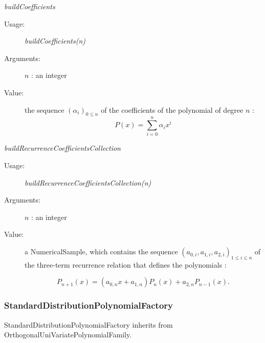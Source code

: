 \begin{description}
\begin{description}
\item \textit{buildCoefficients}
\begin{description}
\item[Usage:]  \textit{buildCoefficients(n)}
\item[Arguments:] $n$ : an integer
\item[Value:]  the sequence $(\alpha_i)_{0 \leq n}$ of the coefficients of the polynomial of degree $n$ :
\begin{equation}\label{coefPol}
P(x) = \sum_{i=0}^{n} \alpha_i x^i
\end{equation}
\end{description}
\bigskip

\item \textit{buildRecurrenceCoefficientsCollection}
\begin{description}
\item[Usage:] \textit{buildRecurrenceCoefficientsCollection(n)}
\item[Arguments:] $n$ : an integer
\item[Value:]  a NumericalSample, which contains the sequence $(a_{0,i}, a_{1,i},a_{2,i})_{1 \leq i \leq n}$ of the three-term recurrence relation that defines the polynomials :

\begin{equation}\label{recCoefPol}
P_{n+1}(x) = (a_{0,n}x+a_{1,n})P_n(x) + a_{2,n}P_{n-1}(x).
\end{equation}
\end{description}

\end{description}
\end{description}

\newpage
\subsubsection{StandardDistributionPolynomialFactory}

StandardDistributionPolynomialFactory inherits from OrthogonalUniVariatePolynomialFamily.

